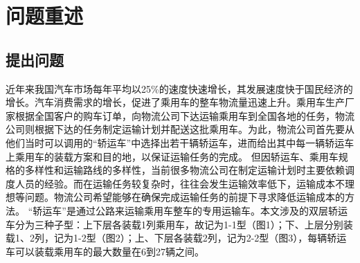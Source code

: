 \documentclass[UTF8]{ctexart}
\begin{document}

\section{问题重述}
\subsection{提出问题}
	近年来我国汽车市场每年平均以25\%的速度快速增长，其发展速度快于国民经济的增长。汽车消费需求的增长，促进了乘用车的整车物流量迅速上升。乘用车生产厂家根据全国客户的购车订单，向物流公司下达运输乘用车到全国各地的任务，物流公司则根据下达的任务制定运输计划并配送这批乘用车。为此，物流公司首先要从他们当时可以调用的“轿运车”中选择出若干辆轿运车，进而给出其中每一辆轿运车上乘用车的装载方案和目的地，以保证运输任务的完成。
但因轿运车、乘用车规格的多样性和运输路线的多样性，当前很多物流公司在制定运输计划时主要依赖调度人员的经验。而在运输任务较复杂时，往往会发生运输效率低下，运输成本不理想等问题。物流公司希望能够在确保完成运输任务的前提下寻求降低运输成本的方法。
“轿运车”是通过公路来运输乘用车整车的专用运输车。本文涉及的双层轿运车分为三种子型：上下层各装载1列乘用车，故记为1-1型（图1）；下、上层分别装载1、2列，记为1-2型（图2）；上、下层各装载2列，记为2-2型（图3），每辆轿运车可以装载乘用车的最大数量在6到27辆之间。
\end{document}
